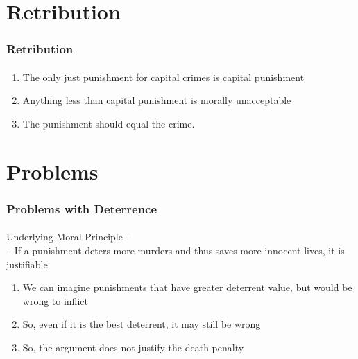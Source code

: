\documentclass{beamer}
\begin{document}
\section{Retribution}

\begin{frame}
    \frametitle{Retribution}
    \framesubtitle{}
\begin{enumerate}
\item The only just punishment for capital crimes is capital punishment
\item Anything less than capital punishment is morally unacceptable
\item The punishment should equal the crime.



\end{enumerate}



\end{frame}


\section{Problems}

\begin{frame}
    \frametitle{Problems with Deterrence}
    \framesubtitle{}
Underlying Moral Principle -- \\
-- If a punishment deters more murders and thus saves more innocent 
lives, it is justifiable.\\

\begin{enumerate}
\item We can imagine punishments that have greater deterrent value, but 
would be wrong to inflict
\item So, even if it is the best deterrent, it may still be wrong
\item So, the argument does not justify the death penalty 


\end{enumerate}



\end{frame}


\section{}
\end{document}
